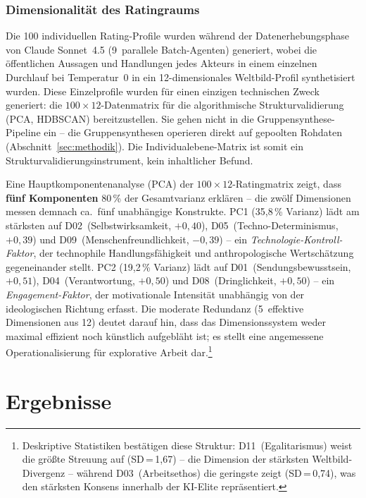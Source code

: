 \documentclass[12pt,a4paper]{article}
\begin{document}
\subsubsection{Dimensionalit\"at des Ratingraums}

Die 100 individuellen Rating-Profile wurden w\"ahrend der Datenerhebungsphase von Claude Sonnet~4.5 (9~parallele Batch-Agenten) generiert, wobei die \"offentlichen Aussagen und Handlungen jedes Akteurs in einem einzelnen Durchlauf bei Temperatur~0 in ein 12-dimensionales Weltbild-Profil synthetisiert wurden. Diese Einzelprofile wurden f\"ur einen einzigen technischen Zweck generiert: die $100 \times 12$-Datenmatrix f\"ur die algorithmische Strukturvalidierung (PCA, HDBSCAN) bereitzustellen. Sie gehen nicht in die Gruppensynthese-Pipeline ein -- die Gruppensynthesen operieren direkt auf gepoolten Rohdaten (Abschnitt~\ref{sec:methodik}). Die Individualebene-Matrix ist somit ein Strukturvalidierungsinstrument, kein inhaltlicher Befund.

Eine Hauptkomponentenanalyse (PCA) der $100 \times 12$-Ratingmatrix zeigt, dass \textbf{f\"unf Komponenten} 80\,\% der Gesamtvarianz erkl\"aren -- die zw\"olf Dimensionen messen demnach ca.\ f\"unf unabh\"angige Konstrukte. PC1 (35,8\,\% Varianz) l\"adt am st\"arksten auf D02~(Selbstwirksamkeit, $+0{,}40$), D05~(Techno-Determinismus, $+0{,}39$) und D09~(Menschenfreundlichkeit, $-0{,}39$) -- ein \emph{Technologie-Kontroll-Faktor}, der technophile Handlungsf\"ahigkeit und anthropologische Wertsch\"atzung gegeneinander stellt. PC2 (19,2\,\% Varianz) l\"adt auf D01~(Sendungsbewusstsein, $+0{,}51$), D04~(Verantwortung, $+0{,}50$) und D08~(Dringlichkeit, $+0{,}50$) -- ein \emph{Engagement-Faktor}, der motivationale Intensit\"at unabh\"angig von der ideologischen Richtung erfasst. Die moderate Redundanz (5~effektive Dimensionen aus 12) deutet darauf hin, dass das Dimensionssystem weder maximal effizient noch k\"unstlich aufgebl\"aht ist; es stellt eine angemessene Operationalisierung f\"ur explorative Arbeit dar.\footnote{Deskriptive Statistiken best\"atigen diese Struktur: D11~(Egalitarismus) weist die gr\"o\ss{}te Streuung auf (SD\,=\,1,67) -- die Dimension der st\"arksten Weltbild-Divergenz -- w\"ahrend D03~(Arbeitsethos) die geringste zeigt (SD\,=\,0,74), was den st\"arksten Konsens innerhalb der KI-Elite repr\"asentiert.}


\section{Ergebnisse}
\label{sec:ergebnisse}
\end{document}
